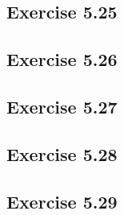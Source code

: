 \documentclass[a4paper,12pt]{article}
\begin{document}
\subsection*{Exercise 5.25}

\subsection*{Exercise 5.26}
\subsection*{Exercise 5.27}
\subsection*{Exercise 5.28}
\subsection*{Exercise 5.29}
\end{document}
